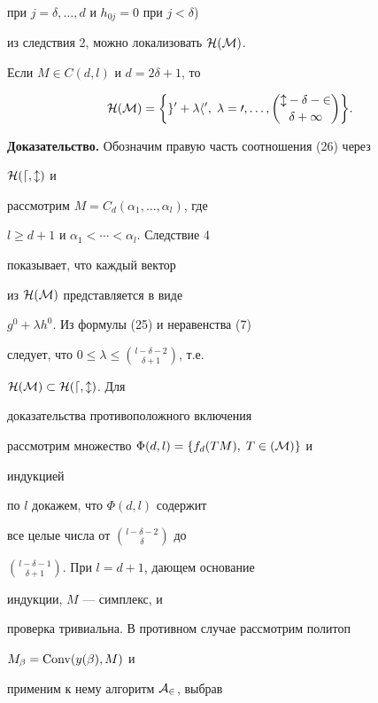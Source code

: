 при $j=\delta,\dotsc,d$ и $h_{0j}=0$ при $j<\delta$)


из следствия 2, можно локализовать $\cal H(M)$.





\begin{thm}


Если $M\in C(d,l)$ и $d=2\delta+1$, то


\begin{equation}


\cal H(M)=\biggl\{g^0+\lambda h^0,\;


\lambda=0,\dotsc,\binom{l-\delta-2}{\delta+1}\biggr\}.


\end{equation}


\end{thm}





{\bf Доказательство.} Обозначим правую часть соотношения (26) через


$\cal H(d,l)$ и


рассмотрим $M=C_d(\alpha_1,\dotsc,\alpha_l)$, где


$l\ge d+1$ и $\alpha_1<\dotsb<\alpha_l$. Следствие 4


показывает, что каждый вектор


из $\cal H(M)$ представляется в виде


$g^0+\lambda h^0$. Из формулы (25) и неравенства (7)


следует, что $0\le\lambda\le\binom{l-\delta-2}{\delta+1}$, т.е.


$\cal H(M)\subset\cal H(d,l)$. Для


доказательства противоположного включения


рассмотрим множество $\Phi(d,l)=\{f_d(TM),\;T\in\cal (M)\}$ и


индукцией


по $l$ докажем, что $\Phi(d,l)$ содержит


все целые числа от $\binom{l-\delta-2}{\delta}$ до


$\binom{l-\delta-1}{\delta+1}$. При $l=d+1$, дающем основание


индукции, $M$ --- симплекс, и


проверка тривиальна. В противном случае рассмотрим политоп


$M_\beta=\operatorname{Conv}(y(\beta),M)$ и


применим к нему алгоритм $\cal A_2$, выбрав



